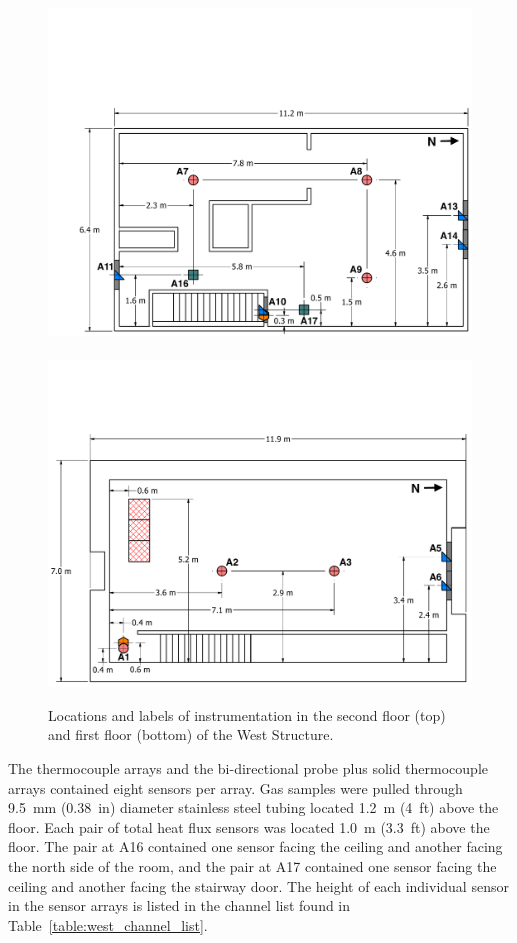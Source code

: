 \documentclass[12pt,oneside]{book}
\begin{document}
\begin{figure}[!ht]
	\includegraphics[width=0.94\columnwidth]{../Figures/Floor_Plans/West_Structure_2nd_Floor_Dimensioned_Instrumentation}
	\\~\\
	\includegraphics[width=\columnwidth]{../Figures/Floor_Plans/West_Structure_1st_Floor_Dimensioned_Instrumentation}
	\caption[Locations and labels of instrumentation in the West Structure.]{Locations and labels of instrumentation in the second floor (top) and first floor (bottom) of the West Structure.}
	\label{fig:west_instrumentation}
\end{figure}

The thermocouple arrays and the bi-directional probe plus solid thermocouple arrays contained eight sensors per array. Gas samples were pulled through 9.5~mm (0.38~in) diameter stainless steel tubing located 1.2~m (4~ft) above the floor. Each pair of total heat flux sensors was located 1.0~m (3.3~ft) above the floor. The pair at A16 contained one sensor facing the ceiling and another facing the north side of the room, and the pair at A17 contained one sensor facing the ceiling and another facing the stairway door. The height of each individual sensor in the sensor arrays is listed in the channel list found in Table~\ref{table:west_channel_list}.
\end{document}
